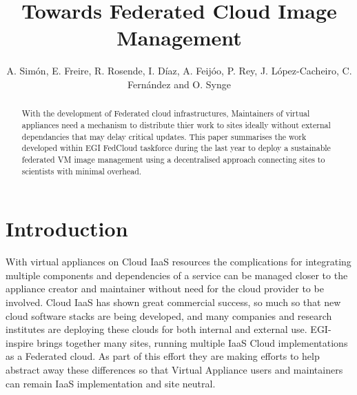 \documentclass{llncs_Ibergrid2013}
\begin{document}
%
\frontmatter          %
%
\pagestyle{headings}  %
%
\mainmatter              %
%
\title{Towards Federated Cloud Image Management}
%
%
\author{A. Sim\'on, E. Freire, R. Rosende, I. D\'iaz, A. Feij\'oo, P. Rey, J. L\'opez-Cacheiro, C. Fern\'andez and O. Synge}
%
%
%




\maketitle              %

\begin{abstract}
With the development of Federated cloud infrastructures, Maintainers of virtual appliances need a mechanism to distribute thier work to sites ideally without external dependancies that may delay critical updates. This paper summarises the work developed within EGI FedCloud taskforce during the last year to deploy a sustainable federated VM image management using a decentralised approach connecting sites to scientists with minimal overhead.
\end{abstract}

%
\section{Introduction}
\label{sect-introduction}
%
With virtual appliances on Cloud IaaS resources the complications for integrating multiple components and dependencies of a service can be managed closer to the appliance creator and maintainer without need for the cloud provider to be involved. Cloud IaaS has shown great commercial success, so much so that new cloud software stacks are being developed, and many companies and research institutes are deploying these clouds for both internal and external use. EGI-inspire brings together many sites, running multiple IaaS Cloud implementations as a Federated cloud. As part of this effort they are making efforts to help abstract away these differences so that Virtual Appliance users and maintainers can remain IaaS implementation and site neutral.
\end{document}
